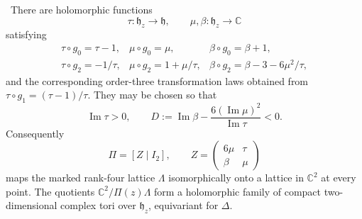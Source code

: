 \begin{proposition}
\label{wb:prop:period-input-audit}
\ There are holomorphic functions
\[
 \tau:\mathfrak h_z\to\mathfrak h,
 \qquad \mu,\beta:\mathfrak h_z\to\mathbb C
\]
satisfying
\[
\begin{array}{lll}
\tau\circ g_0=\tau-1,&\mu\circ g_0=\mu,&\beta\circ g_0=\beta+1,\\
\tau\circ g_2=-1/\tau,&\mu\circ g_2=1+\mu/\tau,
 &\beta\circ g_2=\beta-3-6\mu^2/\tau,
\end{array}
\tag{2.1}
\]
and the corresponding order-three transformation laws obtained from
\(\tau\circ g_1=(\tau-1)/\tau\).  They may be chosen so that
\[
 \operatorname{Im}\tau>0,
 \qquad
 D:=\operatorname{Im}\beta-
 \frac{6(\operatorname{Im}\mu)^2}{\operatorname{Im}\tau}<0.
\tag{2.2}
\]
Consequently
\[
 \Pi=[Z\mid I_2],\qquad
 Z=\begin{pmatrix}6\mu&\tau\\ \beta&\mu\end{pmatrix}
\tag{2.3}
\]
maps the marked rank-four lattice \(\Lambda\) isomorphically onto a lattice
in \(\mathbb C^2\) at every point.  The quotients
\(\mathbb C^2/\Pi(z)\Lambda\) form a holomorphic family of compact
two-dimensional complex tori over \(\mathfrak h_z\), equivariant for
\(\Delta\).
\end{proposition}

